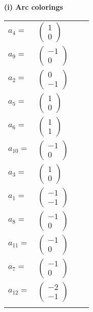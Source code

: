\documentclass[1p]{elsarticle_modified}
\theoremstyle{definition}
\begin{document}
\flushleft \textbf{(i) Arc colorings}\\
\begin{tabular}{m{7pt} m{180pt} m{7pt} m{180pt} }
\flushright $a_{4}=$&$\begin{pmatrix}1\\0\end{pmatrix}$ \\
\flushright $a_{9}=$&$\begin{pmatrix}-1\\0\end{pmatrix}$ \\
\flushright $a_{2}=$&$\begin{pmatrix}0\\-1\end{pmatrix}$ \\
\flushright $a_{5}=$&$\begin{pmatrix}1\\0\end{pmatrix}$ \\
\flushright $a_{6}=$&$\begin{pmatrix}1\\1\end{pmatrix}$ \\
\flushright $a_{10}=$&$\begin{pmatrix}-1\\0\end{pmatrix}$ \\
\flushright $a_{3}=$&$\begin{pmatrix}1\\0\end{pmatrix}$ \\
\flushright $a_{1}=$&$\begin{pmatrix}-1\\-1\end{pmatrix}$ \\
\flushright $a_{8}=$&$\begin{pmatrix}-1\\0\end{pmatrix}$ \\
\flushright $a_{11}=$&$\begin{pmatrix}-1\\0\end{pmatrix}$ \\
\flushright $a_{7}=$&$\begin{pmatrix}-1\\0\end{pmatrix}$ \\
\flushright $a_{12}=$&$\begin{pmatrix}-2\\-1\end{pmatrix}$\\&\end{tabular}
\end{document}
